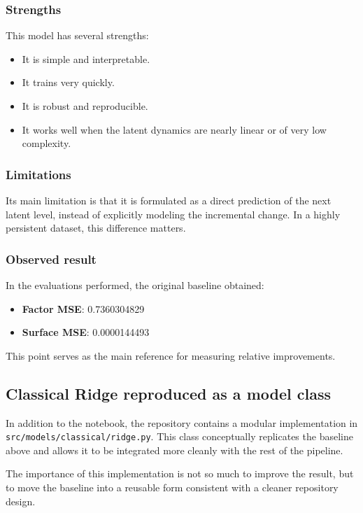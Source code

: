 \documentclass[11pt,a4paper]{article}
\begin{document}
\subsubsection{Strengths}
This model has several strengths:

\begin{itemize}
    \item It is simple and interpretable.
    \item It trains very quickly.
    \item It is robust and reproducible.
    \item It works well when the latent dynamics are nearly linear or of very low complexity.
\end{itemize}

\subsubsection{Limitations}
Its main limitation is that it is formulated as a direct prediction of the next latent level, instead of explicitly modeling the incremental change. In a highly persistent dataset, this difference matters.

\subsubsection{Observed result}
In the evaluations performed, the original baseline obtained:

\begin{itemize}
    \item \textbf{Factor MSE}: 0.7360304829
    \item \textbf{Surface MSE}: 0.0000144493
\end{itemize}

This point serves as the main reference for measuring relative improvements.

\subsection{Classical Ridge reproduced as a model class}

In addition to the notebook, the repository contains a modular implementation in \texttt{src/models/classical/ridge.py}. This class conceptually replicates the baseline above and allows it to be integrated more cleanly with the rest of the pipeline.

The importance of this implementation is not so much to improve the result, but to move the baseline into a reusable form consistent with a cleaner repository design.
\end{document}
